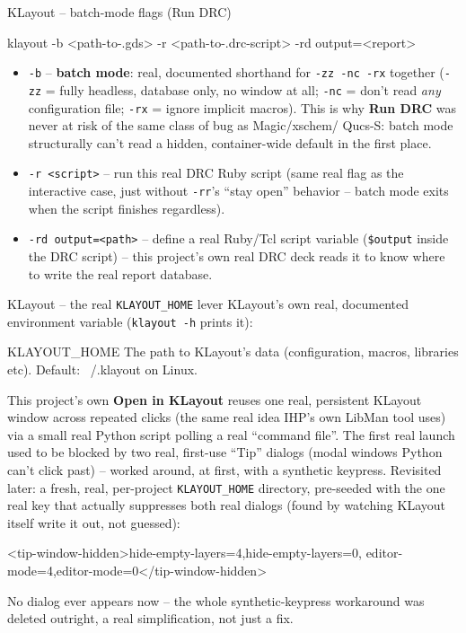\documentclass[aspectratio=169]{beamer}
\begin{document}
\begin{frame}[fragile]{KLayout -- batch-mode flags (Run DRC)}
\begin{cli}
klayout -b <path-to-.gds> -r <path-to-.drc-script> -rd output=<report>
\end{cli}
\begin{itemize}
  \item \texttt{-b} -- \textbf{batch mode}: real, documented shorthand
        for \texttt{-zz -nc -rx} together (\texttt{-zz} = fully
        headless, database only, no window at all; \texttt{-nc} =
        don't read \emph{any} configuration file; \texttt{-rx} =
        ignore implicit macros). This is why \textbf{Run DRC} was
        never at risk of the same class of bug as Magic/xschem/
        Qucs-S: batch mode structurally can't read a hidden,
        container-wide default in the first place.
  \item \texttt{-r <script>} -- run this real DRC Ruby script (same
        real flag as the interactive case, just without
        \texttt{-rr}'s ``stay open'' behavior -- batch mode exits when
        the script finishes regardless).
  \item \texttt{-rd output=<path>} -- define a real Ruby/Tcl script
        variable (\texttt{\$output} inside the DRC script) -- this
        project's own real DRC deck reads it to know where to write
        the real report database.
\end{itemize}
\end{frame}

\begin{frame}[fragile]{KLayout -- the real \texttt{KLAYOUT\_HOME} lever}
KLayout's own real, documented environment variable
(\texttt{klayout -h} prints it):
\begin{cli}
KLAYOUT_HOME   The path to KLayout's data (configuration, macros,
               libraries etc). Default: ~/.klayout on Linux.
\end{cli}
This project's own \textbf{Open in KLayout} reuses one real,
persistent KLayout window across repeated clicks (the same real idea
IHP's own LibMan tool uses) via a small real Python script polling a
real ``command file''. The first real launch used to be blocked by two
real, first-use ``Tip'' dialogs (modal windows Python can't click
past) -- worked around, at first, with a synthetic keypress. Revisited
later: a fresh, real, per-project \texttt{KLAYOUT\_HOME} directory,
pre-seeded with the one real key that actually suppresses both real
dialogs (found by watching KLayout itself write it out, not guessed):
\begin{cli}
<tip-window-hidden>hide-empty-layers=4,hide-empty-layers=0,
                    editor-mode=4,editor-mode=0</tip-window-hidden>
\end{cli}
No dialog ever appears now -- the whole synthetic-keypress workaround
was deleted outright, a real simplification, not just a fix.
\end{frame}
\end{document}
